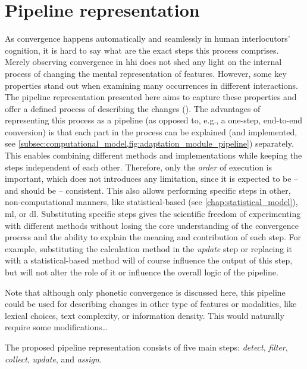 \section{Pipeline representation}
\label{sec:pipeline_representation}

As convergence happens automatically and seamlessly in human interlocutors' cognition, it is hard to say what are the exact steps this process comprises.
Merely observing convergence in \ac{hhi} does not shed any light on the internal process of changing the mental representation of features.
However, some key properties stand out when examining many occurrences in different interactions.
The pipeline representation presented here aims to capture these properties and offer a defined process of describing the changes ().
The advantages of representing this process as a pipeline (as opposed to, e.g., a one-step, end-to-end conversion) is that each part in the process can be explained (and implemented, see \cref{subsec:computational_model,fig:adaptation_module_pipeline}) separately.
This enables combining different methods and implementations while keeping the steps independent of each other.
Therefore, only the \emph{order} of execution is important, which does not introduces any limitation, since it is expected to be -- and should be -- consistent.
This also allows performing specific steps in other, non-computational manners, like statistical-based (see \cref{chap:statistical_model}), \ac{ml}, or \ac{dl}.
Substituting specific steps gives the scientific freedom of experimenting with different methods without losing the core understanding of the convergence process and the ability to explain the meaning and contribution of each step.
For example, substituting the calculation method in the \textit{update} step or replacing it with a statistical-based method will of course influence the output of this step, but will not alter the role of it or influence the overall logic of the pipeline.

Note that although only phonetic convergence is discussed here, this pipeline could be used for describing changes in other type of features or modalities, like lexical choices, text complexity, or information density.
This would naturally require some modifications\ldots

The proposed pipeline representation consists of five main steps: \emph{detect}, \emph{filter}, \emph{collect}, \emph{update}, and \emph{assign}.

